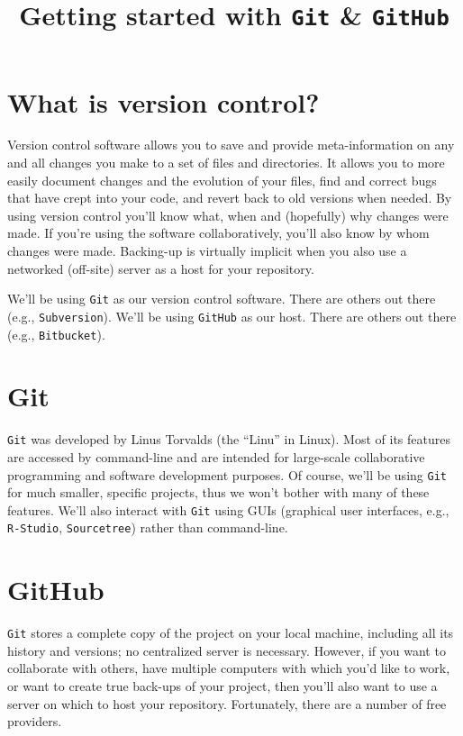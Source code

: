 \documentclass[12pt,letterpaper]{article}
\author{}
\title{Getting started with \texttt{Git} \& \texttt{GitHub}}
\date{}
\begin{document}
\maketitle

\tableofcontents

\pagebreak


\section{What is version control?}
Version control software allows you to save and provide meta-information on any and all changes you make to a set of files and directories.
It allows you to more easily document changes and the evolution of your files, find and correct bugs that have crept into your code, and revert back to old versions when needed.
By using version control you'll know what, when and (hopefully) why changes were made.
If you're using the software collaboratively, you'll also know by whom changes were made.
Backing-up is virtually implicit when you also use a networked (off-site) server as a host for your repository.

We'll be using \texttt{Git} as our version control software.
There are others out there (e.g., \texttt{Subversion}).
We'll be using \texttt{GitHub} as our host.
There are others out there (e.g., \texttt{Bitbucket}).

\section{Git}
\texttt{Git} was developed by Linus Torvalds (the ``Linu'' in Linux).
Most of its features are accessed by command-line and are intended for large-scale collaborative programming and software development purposes.
Of course, we'll be using \texttt{Git} for much smaller, specific projects, thus we 
won't bother with many of these features.
We'll also interact with \texttt{Git} using GUIs (graphical user interfaces, e.g., \texttt{R-Studio}, \texttt{Sourcetree}) rather than command-line.


\section{GitHub}
\texttt{Git} stores a complete copy of the project on your local machine, including all its history and versions; no centralized server is necessary.
However, if you want to collaborate with others, have multiple computers with which you'd like to work, or want to create true back-ups of your project, then you'll also want to use a server on which to host your repository.
Fortunately, there are a number of free providers.
\end{document}
